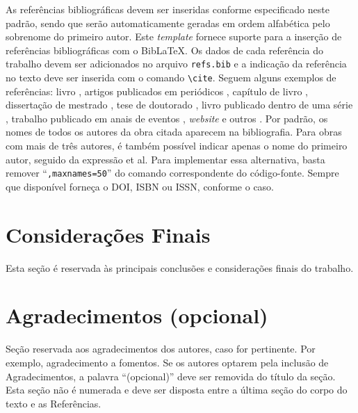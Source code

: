 \documentclass{pssbmac}
\begin{document}
As referências bibliográficas devem ser inseridas conforme especificado neste padrão, 
sendo que serão automaticamente geradas em ordem alfabética pelo sobrenome do primeiro autor. 
Este {\it template} fornece suporte para a inserção de referências bibliográficas com o Bib\LaTeX{}. 
Os dados de cada referência do trabalho devem ser adicionados no arquivo \verb+refs.bib+ e a
 indicação da referência no texto deve ser inserida com o comando \verb+\cite+. 
 Seguem alguns exemplos de referências: livro \cite{Boldrini}, artigos publicados em periódicos 
 \cite{Contiero,Cuminato}, capítulo de livro \cite{daSilva}, dissertação de mestrado \cite{Diniz}, 
 tese de doutorado \cite{Mallet}, livro publicado dentro de uma série \cite{Gomes}, 
 trabalho publicado em anais de eventos \cite{Santos}, {\it website} e outros \cite{CNMAC}. 
 Por padrão, os nomes de todos os autores da obra citada aparecem na bibliografia. 
 Para obras com mais de três autores, é também possível indicar apenas o nome do primeiro autor, 
 seguido da expressão et al. Para implementar essa alternativa, basta remover ``\verb+,maxnames=50+'' 
 do comando correspondente do código-fonte. Sempre que disponível forneça o DOI, ISBN ou ISSN, conforme o caso.

\section{Considerações Finais}

Esta seção é reservada às principais conclusões e considerações finais do trabalho.

\section*{Agradecimentos (opcional)}

Seção reservada aos agradecimentos dos autores, caso for pertinente. Por exemplo, agradecimento a fomentos. Se os autores optarem pela inclusão de Agradecimentos, a palavra ``(opcional)'' deve ser removida do título da seção. Esta seção não é numerada e deve ser disposta entre a última seção do corpo do texto e as Referências.


\printbibliography
\end{document}
